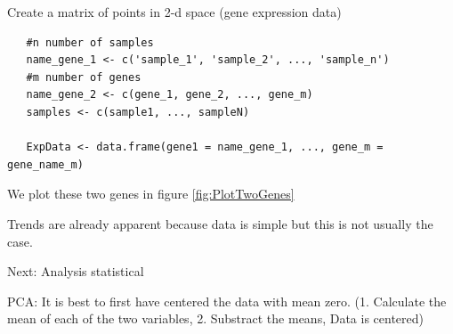 \documentclass[11pt, oneside]{article}   	%
\begin{document}
Create a matrix of points in 2-d space (gene expression data)

	
\begin{framed}
\begin{verbatim}
   #n number of samples
   name_gene_1 <- c('sample_1', 'sample_2', ..., 'sample_n') 
   #m number of genes
   name_gene_2 <- c(gene_1, gene_2, ..., gene_m)    
   samples <- c(sample1, ..., sampleN)

   ExpData <- data.frame(gene1 = name_gene_1, ..., gene_m = gene_name_m)	
\end{verbatim}
\end{framed}


We plot these two genes in figure \ref{fig:PlotTwoGenes}


Trends are already apparent because data is simple but this is not usually the case.

Next: Analysis statistical

PCA: It is best to first have centered the data with mean zero.
(1. Calculate the mean of each of the two variables, 2.  Substract the means, Data is centered)
\end{document}
